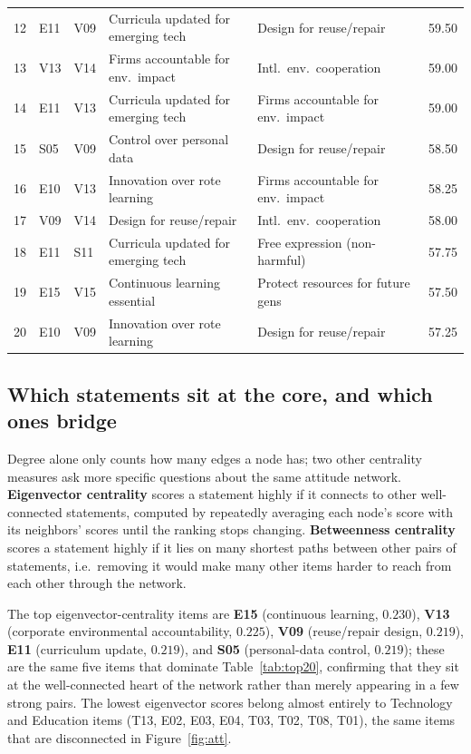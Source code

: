 \documentclass[10pt]{article}
\begin{document}
\begin{table}[H]
\begin{tabular}{@{}rllp{5.6cm}p{5.6cm}r@{}}
12 & E11 & V09 & Curricula updated for emerging tech & Design for reuse/repair & 59.50 \\
13 & V13 & V14 & Firms accountable for env.\ impact & Intl.\ env.\ cooperation & 59.00 \\
14 & E11 & V13 & Curricula updated for emerging tech & Firms accountable for env.\ impact & 59.00 \\
15 & S05 & V09 & Control over personal data & Design for reuse/repair & 58.50 \\
16 & E10 & V13 & Innovation over rote learning & Firms accountable for env.\ impact & 58.25 \\
17 & V09 & V14 & Design for reuse/repair & Intl.\ env.\ cooperation & 58.00 \\
18 & E11 & S11 & Curricula updated for emerging tech & Free expression (non-harmful) & 57.75 \\
19 & E15 & V15 & Continuous learning essential & Protect resources for future gens & 57.50 \\
20 & E10 & V09 & Innovation over rote learning & Design for reuse/repair & 57.25 \\
\bottomrule
\end{tabular}
\end{table}

\subsection{Which statements sit at the core, and which ones bridge}
Degree alone only counts how many edges a node has; two other centrality measures ask
more specific questions about the same attitude network. \textbf{Eigenvector centrality}
scores a statement highly if it connects to other well-connected statements, computed by
repeatedly averaging each node's score with its neighbors' scores until the ranking
stops changing. \textbf{Betweenness centrality} scores a statement highly if it lies on
many shortest paths between other pairs of statements, i.e.\ removing it would make many
other items harder to reach from each other through the network.

The top eigenvector-centrality items are \textbf{E15} (continuous learning, $0.230$),
\textbf{V13} (corporate environmental accountability, $0.225$), \textbf{V09}
(reuse/repair design, $0.219$), \textbf{E11} (curriculum update, $0.219$), and
\textbf{S05} (personal-data control, $0.219$); these are the same five items that
dominate Table~\ref{tab:top20}, confirming that they sit at the well-connected heart of
the network rather than merely appearing in a few strong pairs. The lowest
eigenvector scores belong almost entirely to Technology and Education items (T13, E02,
E03, E04, T03, T02, T08, T01), the same items that are disconnected in
Figure~\ref{fig:att}.
\end{document}
